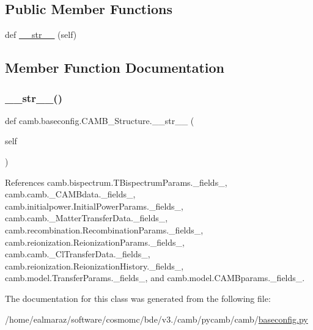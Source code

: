 \subsection*{Public Member Functions}
\begin{DoxyCompactItemize}
\item 
def \mbox{\hyperlink{classcamb_1_1baseconfig_1_1CAMB__Structure_ad3144b599470b3462d0996edf4e36262}{\+\_\+\+\_\+str\+\_\+\+\_\+}} (self)
\end{DoxyCompactItemize}


\subsection{Member Function Documentation}
\mbox{\label{classcamb_1_1baseconfig_1_1CAMB__Structure_ad3144b599470b3462d0996edf4e36262}} 
\subsubsection{\texorpdfstring{\+\_\+\+\_\+str\+\_\+\+\_\+()}{\_\_str\_\_()}}
{\footnotesize\ttfamily def camb.\+baseconfig.\+C\+A\+M\+B\+\_\+\+Structure.\+\_\+\+\_\+str\+\_\+\+\_\+ (\begin{DoxyParamCaption}\item[{}]{self }\end{DoxyParamCaption})}



References camb.\+bispectrum.\+T\+Bispectrum\+Params.\+\_\+fields\+\_\+, camb.\+camb.\+\_\+\+C\+A\+M\+Bdata.\+\_\+fields\+\_\+, camb.\+initialpower.\+Initial\+Power\+Params.\+\_\+fields\+\_\+, camb.\+camb.\+\_\+\+Matter\+Transfer\+Data.\+\_\+fields\+\_\+, camb.\+recombination.\+Recombination\+Params.\+\_\+fields\+\_\+, camb.\+reionization.\+Reionization\+Params.\+\_\+fields\+\_\+, camb.\+camb.\+\_\+\+Cl\+Transfer\+Data.\+\_\+fields\+\_\+, camb.\+reionization.\+Reionization\+History.\+\_\+fields\+\_\+, camb.\+model.\+Transfer\+Params.\+\_\+fields\+\_\+, and camb.\+model.\+C\+A\+M\+Bparams.\+\_\+fields\+\_\+.



The documentation for this class was generated from the following file\+:\begin{DoxyCompactItemize}
\item 
/home/ealmaraz/software/cosmomc/bde/v3./camb/pycamb/camb/\mbox{\hyperlink{baseconfig_8py}{baseconfig.\+py}}\end{DoxyCompactItemize}
